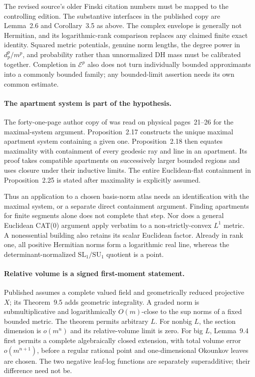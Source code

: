 The revised source's older Finski citation numbers must be
mapped to the controlling edition. The substantive interfaces
in the published copy are Lemma~2.6 and Corollary~3.5 as above.
The complex envelope is generally not Hermitian, and its
logarithmic-rank comparison replaces any claimed finite exact
identity. Squared metric potentials, genuine norm lengths,
the degree power in \(d_p^p/m^p\), and probability rather
than unnormalized DH mass must be calibrated together.
Completion in \(\mathcal E^p\) also does not turn individually
bounded approximants into a commonly bounded family; any
bounded-limit assertion needs its own common estimate.

\paragraph{The apartment system is part of the hypothesis.}
The forty-one-page author copy of \cite{Parreau00AffineAuthor}
was read on physical pages~21--26 for the maximal-system
argument. Proposition~2.17 constructs the unique maximal
apartment system containing a given one. Proposition~2.18
then equates maximality with containment of every geodesic
ray and line in an apartment. Its proof takes compatible
apartments on successively larger bounded regions and uses
closure under their inductive limits.
The entire Euclidean-flat containment in Proposition~2.25
is stated after maximality is explicitly assumed.

Thus an application to a chosen basis-norm atlas needs an
identification with the maximal system, or a separate direct
containment argument. Finding apartments for finite segments
alone does not complete that step. Nor does a general Euclidean
CAT(0) argument apply verbatim to a non-strictly-convex
\(L^1\) metric. A nonessential building also retains its
scalar Euclidean factor. Already in rank one, all positive
Hermitian norms form a logarithmic real line, whereas the
determinant-normalized \(\mathrm{SL}_1/\mathrm{SU}_1\)
quotient is a point.

\paragraph{Relative volume is a signed first-moment statement.}
Published \cite[Section~9.1]{BE21} assumes a complete valued
field and geometrically reduced projective \(X\); its
Theorem~9.5 adds geometric integrality. A graded norm is
submultiplicative and logarithmically \(O(m)\)-close to the
sup norms of a fixed bounded metric. The theorem permits
arbitrary \(L\). For nonbig \(L\), the section dimension
is \(o(m^n)\) and its relative-volume limit is zero.
For big \(L\), Lemma~9.4 first permits a complete
algebraically closed extension, with total volume error
\(o(m^{n+1})\), before a regular rational point and
one-dimensional Okounkov leaves are chosen.
The two negative leaf-log functions are separately
superadditive; their difference need not be.

